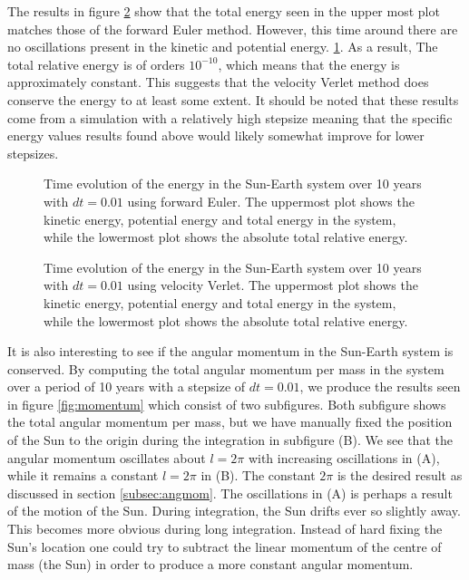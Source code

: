 \documentclass[a4paper, 10pt, reqno]{amsart}
\begin{document}
The results in figure \ref{fig:energy_verlet} show that the total energy seen in the upper most plot matches those of the forward Euler method. However, this time around there are no oscillations present in the kinetic and potential energy. \ref{fig:energy_euler}. As a result, The total relative energy is of orders $10^{-10}$, which means that the energy is approximately constant. This suggests that the velocity Verlet method does conserve the energy to at least some extent. It should be noted that these results come from a simulation with a relatively high stepsize meaning that the specific energy values results found above would likely somewhat improve for lower stepsizes.


\begin{figure}
    \centering
    \subfloat{ }
    \newline
    \subfloat{ }
    \caption{Time evolution of the energy in the Sun-Earth system over 10 years with $dt = 0.01$ using forward Euler.
    The uppermost plot shows the kinetic energy, potential energy and total energy in the system, while the lowermost plot shows the absolute total relative energy.}
    \label{fig:energy_euler}
\end{figure}


\begin{figure}
    \centering
    \subfloat{ }
    \newline
    \subfloat{ }
    \caption{Time evolution of the energy in the Sun-Earth system over 10 years with $dt = 0.01$ using velocity Verlet.
    The uppermost plot shows the kinetic energy, potential energy and total energy in the system, while the lowermost plot shows the absolute total relative energy.}
    \label{fig:energy_verlet}
\end{figure}




It is also interesting to see if the angular momentum in the Sun-Earth system is conserved. By computing the total angular momentum per mass in the system over a period of 10 years with a stepsize of $dt = 0.01$, we produce the results seen in figure \ref{fig:momentum} which consist of two subfigures. Both subfigure shows the total angular momentum per mass, but we have manually fixed the position of the Sun to the origin during the integration in subfigure (B). We see that the angular momentum oscillates about $l = 2\pi$ with increasing oscillations in (A), while it remains a constant $l = 2\pi$ in (B). The constant $2\pi$ is the desired result as discussed in section \ref{subsec:angmom}. The oscillations in (A) is perhaps a result of the motion of the Sun. During integration, the Sun drifts ever so slightly away. This becomes more obvious during long integration. Instead of hard fixing the Sun's location one could try to subtract the linear momentum of the centre of mass (the Sun) in order to produce a more constant angular momentum.
\end{document}
